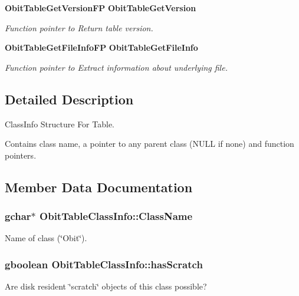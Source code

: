 \begin{CompactItemize}
{\bf Obit\-Table\-Get\-Version\-FP} {\bf Obit\-Table\-Get\-Version}
\begin{CompactList}\small\item\em Function pointer to Return table version. \item\end{CompactList}\item 
{\bf Obit\-Table\-Get\-File\-Info\-FP} {\bf Obit\-Table\-Get\-File\-Info}
\begin{CompactList}\small\item\em Function pointer to Extract information about underlying file. \item\end{CompactList}\end{CompactItemize}


\subsection{Detailed Description}
Class\-Info Structure For Table. 

Contains class name, a pointer to any parent class (NULL if none) and function pointers. 



\subsection{Member Data Documentation}
\subsubsection{\setlength{\rightskip}{0pt plus 5cm}gchar$\ast$ {\bf Obit\-Table\-Class\-Info::Class\-Name}}\label{structObitTableClassInfo_o2}


Name of class (\char`\"{}Obit\char`\"{}). 

\subsubsection{\setlength{\rightskip}{0pt plus 5cm}gboolean {\bf Obit\-Table\-Class\-Info::has\-Scratch}}\label{structObitTableClassInfo_o1}


Are disk resident \char`\"{}scratch\char`\"{} objects of this class possible? 

